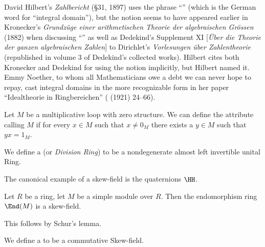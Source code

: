 \begin{remark}
David Hilbert's \emph{Zahlbericht} (\S31, 1897) uses the phrase ``''
(which is the German word for ``integral domain''), but the notion
seems to have appeared earlier in Kronecker's \emph{Grundz\"{u}ge einer arithmetischen Theorie der algebraischen Gr\"{o}ssen}
(1882) when discussing ``'' as well
as Dedekind's Supplement XI [\emph{\"{U}ber die Theorie der ganzen algebraischen Zahlen}] to Dirichlet's \emph{Vorlesungen \"{u}ber Zahlentheorie}
(republished in volume 3 of Dedekind's collected works). Hilbert cites
both Kronecker and Dedekind for using the notion implicitly, but
Hilbert named it. Emmy Noether, to whom all Mathematicians owe a debt
we can never hope to repay, cast integral domains in the more
recognizable form in her paper ``Idealtheorie in Ringbereichen''
(  (1921) 24--66).
\end{remark}

\begin{definition}
Let $M$ be a multiplicative loop with zero structure.
We can define the attribute calling $M$  
if for every $x\in M$ such that $x\neq 0_{M}$ there exists a $y\in M$
such that $yx=1_{M}$.
\end{definition}

\begin{definition}
We define a  (or \emph{Division Ring}) to be a
nondegenerate almost left invertible unital Ring.
\end{definition}

\begin{example}
The canonical example of a skew-field is the quaternions $\HH$.
\end{example}

\begin{theorem}
Let $R$ be a ring, let $M$ be a simple module over $R$. Then the endomorphism ring $\End(M)$ is a
skew-field.
\end{theorem}

This follows by Schur's lemma.

\begin{definition}[Field]
We define a  to be a commutative Skew-field.
\end{definition}

